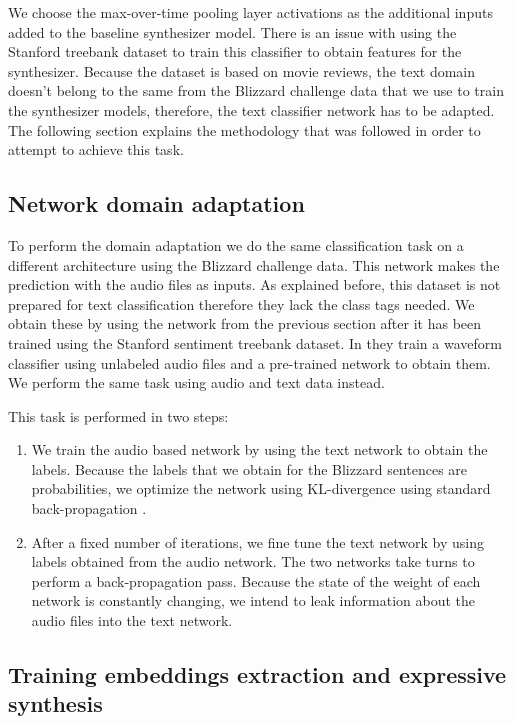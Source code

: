 We choose the max-over-time pooling layer activations as the additional inputs added to the baseline synthesizer model. There is an issue with using the Stanford treebank dataset to train this classifier to obtain features for the synthesizer. Because the dataset is based on movie reviews, the text domain doesn't belong to the same from the Blizzard challenge data that we use to train the synthesizer models, therefore, the text classifier network has to be adapted. The following section explains the methodology that was followed in order to attempt to achieve this task.

\subsection{Network domain adaptation}

To perform the domain adaptation we do the same classification task on a different architecture using the Blizzard challenge data. This network makes the prediction with the audio files as inputs. As explained before, this dataset is not prepared for text classification therefore they lack the class tags needed. We obtain these by using the network from the previous section after it has been trained using the Stanford sentiment treebank dataset. In \cite{aytar2016soundnet} they train a waveform classifier using unlabeled audio files and a pre-trained network to obtain them. We perform the same task using audio and text data instead.

This task is performed in two steps:

\begin{enumerate}
    \item We train the audio based network by using the text network to obtain the labels. Because the labels that we obtain for the Blizzard sentences are probabilities, we optimize the network using KL-divergence using standard back-propagation \cite{aytar2016soundnet}.
    \item After a fixed number of iterations, we fine tune \cite{yosinski2014transferable} the text network by using labels obtained from the audio network. The two networks take turns to perform a back-propagation pass. Because the state of the weight of each network is constantly changing, we intend to leak information about the audio files into the text network.
\end{enumerate}

\subsection{Training embeddings extraction and expressive synthesis}

